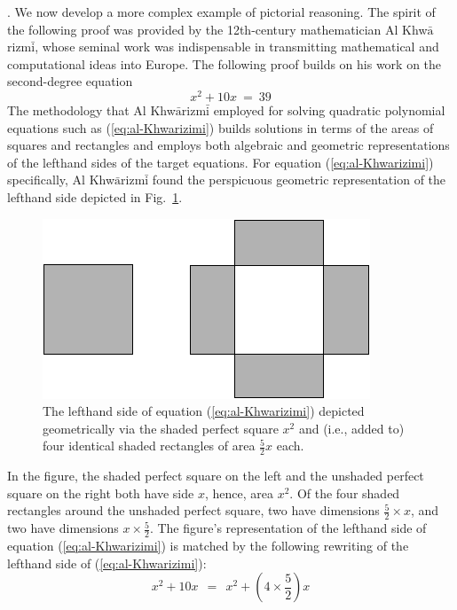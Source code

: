 .
We now develop a more complex example of pictorial reasoning.  The spirit of the following proof was provided by the 12th-century mathematician Al Khw$\bar{\mbox{a}}$rizm$\bar{\mbox{i}}$, whose seminal work \cite{Al-Khwarizmi} was indispensable in transmitting mathematical and computational ideas into Europe.  The following proof builds on his work on the second-degree equation
\begin{equation}
\label{eq:al-Khwarizimi}
x^2 + 10 x \ = \ 39
\end{equation}
The methodology that Al Khw$\bar{\mbox{a}}$rizm$\bar{\mbox{i}}$ employed for solving quadratic polynomial equations such as (\ref{eq:al-Khwarizimi}) builds solutions in terms of the areas of squares and rectangles and employs both algebraic and geometric representations of the lefthand sides of the target equations.  For equation (\ref{eq:al-Khwarizimi}) specifically, Al Khw$\bar{\mbox{a}}$rizm$\bar{\mbox{i}}$ found the perspicuous geometric representation of the lefthand side depicted in Fig.~\ref{fig:EqElKwarismi1}.
\begin{figure}[ht]
\begin{center}
       \includegraphics[scale=0.4]{FiguresArithmetic/EquationElKwarismi1}
\caption{The lefthand side of equation (\ref{eq:al-Khwarizimi})
  depicted geometrically via the shaded perfect square $x^2$ and (i.e., added
  to) four identical shaded rectangles of area $\frac{5}{2} x$ each.}
       \label{fig:EqElKwarismi1}
\end{center}
\end{figure}
In the figure, the shaded perfect square on the left and the unshaded perfect square on the right both have side $x$, hence, area $x^2$.  Of the four shaded rectangles around the unshaded perfect square, two have dimensions $\frac{5}{2} \times x$, and two have dimensions $x \times \frac{5}{2}$.  The figure's representation of the lefthand side of equation (\ref{eq:al-Khwarizimi}) is matched by the following rewriting of the lefthand side of (\ref{eq:al-Khwarizimi}):
\[ x^2 + 10 x \ \ = \ \ x^2 + \left( 4 \times \frac{5}{2} \right) x \]

